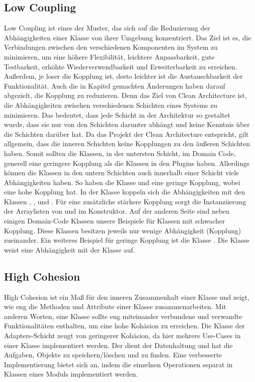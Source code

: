 \subsection{Low Coupling}
Low Coupling ist eines der Muster, das sich auf die Reduzierung der Abhängigkeiten einer Klasse von ihrer Umgebung konzentriert. Das Ziel ist es, die Verbindungen zwischen den verschiedenen Komponenten im System zu minimieren, um eine höhere Flexibilität, leichtere Anpassbarkeit, gute Testbarkeit, erhöhte Wiederverwendbarkeit und Erweiterbarkeit zu erreichen. Außerdem, je loser die Kopplung ist, desto leichter ist die Austauschbarkeit der Funktionalität.
Auch die in Kapitel  gemachten Änderungen haben darauf abgezielt, die Kopplung zu reduzieren. Denn das Ziel von Clean Architecture ist, die Abhängigkeiten zwischen verschiedenen Schichten eines Systems zu minimieren. Das bedeutet, dass jede Schicht in der Architektur so gestaltet wurde, dass sie nur von den Schichten darunter abhängt und keine Kenntnis über die Schichten darüber hat. Da das Projekt der Clean Architecture entspricht, gilt allgemein, dass die inneren Schichten keine Kopplungen zu den äußeren Schichten haben. 
Somit sollten die Klassen, in der untersten Schicht, im Domain Code, generell eine geringere Kopplung als die Klassen in den Plugins haben. Allerdings können die Klassen in den untern Schichten auch innerhalb einer Schicht viele Abhängigkeiten haben. So haben die Klasse  und  eine geringe Kopplung, wobei  eine hohe Kopplung hat.  
In der Klasse  koppeln sich die Abhängigkeiten mit den Klassen , ,  und . Für eine zusätzliche stärkere Kopplung sorgt die Instanziierung der Arraylisten von  und  im Konstruktor.
Auf der anderen Seite sind neben einigen Domain-Code Klassen unsere \href{https://github.com/MichaelaHaag/RezeptApp/blob/main/0-Plugins/src/main/java/de/rezeptapp/plugins/gui}{} Beispiele für Klassen mit schwacher Kopplung. Diese Klassen besitzen jeweils nur wenige Abhängigkeit (Kopplung) zueinander. 
Ein weiteres Beispiel für geringe Kopplung ist die Klasse . Die Klasse weist eine Abhängigkeit mit der Klasse  auf.

\subsection{High Cohesion}
High Cohesion ist ein Maß für den inneren Zusammenhalt einer Klasse und zeigt, wie eng die Methoden und Attribute einer Klasse zusammenarbeiten. Mit anderen Worten, eine Klasse sollte eng miteinander verbundene und verwandte Funktionalitäten enthalten, um eine hohe Kohäsion zu erreichen. 
Die Klasse  der Adapters-Schicht zeugt von geringerer Kohäsion, da hier mehrere Use-Cases in einer Klasse implementiert werden. Der  dient der Datenhaltung und hat die Aufgaben, Objekte zu speichern/löschen und zu finden. Eine verbesserte Implementierung bietet sich an, indem die einzelnen Operationen separat in Klassen eines Moduls implementiert werden.

